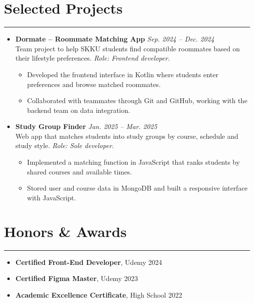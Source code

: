 \documentclass[letterpaper, 10pt]{article}
\begin{document}
\section*{Selected Projects}
\hrule
\vspace{4pt}
\begin{itemize}
    \item \textbf{Dormate -- Roommate Matching App} \hfill \textit{Sep. 2024 -- Dec. 2024} \\
    Team project to help SKKU students find compatible roommates based on their lifestyle preferences. \newline \textit{Role: Frontend developer.}
    \begin{itemize}
        \item Developed the frontend interface in Kotlin where students enter preferences and browse matched roommates.
        \item Collaborated with teammates through Git and GitHub, working with the backend team on data integration.
    \end{itemize}
    \item \textbf{Study Group Finder} \hfill \textit{Jan. 2025 -- Mar. 2025} \\
    Web app that matches students into study groups by course, schedule and study style. \newline \textit{Role: Sole developer.}
    \begin{itemize}
        \item Implemented a matching function in JavaScript that ranks students by shared courses and available times.
        \item Stored user and course data in MongoDB and built a responsive interface with JavaScript.
    \end{itemize}
\end{itemize}
\section*{Honors \& Awards}
\hrule
\vspace{4pt}
\begin{itemize}
    \item \textbf{Certified Front-End Developer}, Udemy \hfill 2024
    \item \textbf{Certified Figma Master}, Udemy \hfill 2023
    \item \textbf{Academic Excellence Certificate}, High School \hfill 2022
\end{itemize}
\end{document}
